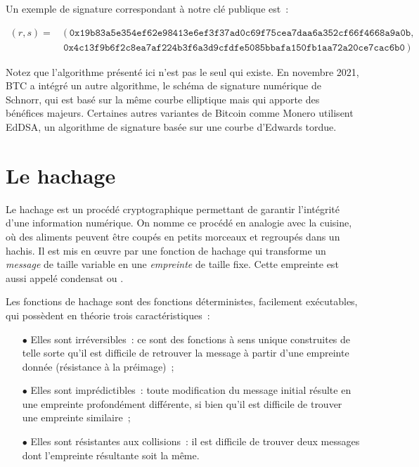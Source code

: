 Un exemple de signature correspondant à notre clé publique est~:

{ \footnotesize
\begin{align*}
(r, s) = &~(~\mathtt{0x19b83a5e354ef62e98413e6ef3f37ad0c69f75cea7daa6a352cf66f4668a9a0b}, \\
    &~\mathtt{0x4c13f9b6f2c8ea7af224b3f6a3d9cfdfe5085bbafa150fb1aa72a20ce7cac6b0}~)
\end{align*}
}

Notez que l'algorithme présenté ici n'est pas le seul qui existe. En novembre 2021, BTC a intégré un autre algorithme, le schéma de signature numérique de Schnorr, qui est basé sur la même courbe elliptique mais qui apporte des bénéfices majeurs. Certaines autres variantes de Bitcoin comme Monero utilisent EdDSA, un algorithme de signature basée sur une courbe d'Edwards tordue.

\section{Le hachage} %

Le hachage est un procédé cryptographique permettant de garantir l'intégrité d'une information numérique. On nomme ce procédé en analogie avec la cuisine, où des aliments peuvent être coupés en petits morceaux et regroupés dans un hachis. Il est mis en œuvre par une fonction de hachage qui transforme un \emph{message} de taille variable en une \emph{empreinte} de taille fixe. Cette empreinte est aussi appelé condensat ou .

Les fonctions de hachage sont des fonctions déterministes, facilement exécutables, qui possèdent en théorie trois caractéristiques~:

\begin{itemize}
  \item[$\bullet$] Elles sont irréversibles~: ce sont des fonctions à sens unique construites de telle sorte qu'il est difficile de retrouver la message à partir d'une empreinte donnée (résistance à la préimage)~;
  \item[$\bullet$] Elles sont imprédictibles~: toute modification du message initial résulte en une empreinte profondément différente, si bien qu'il est difficile de trouver une empreinte similaire~;
  \item[$\bullet$] Elles sont résistantes aux collisions~: il est difficile de trouver deux messages dont l'empreinte résultante soit la même. 
\end{itemize}

